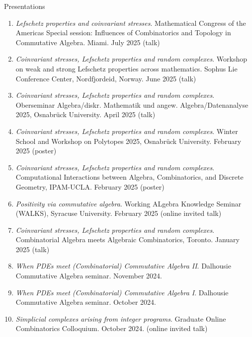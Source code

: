 \documentclass[12pt]{resume} %
\begin{document}

 
\begin{rSection}{Presentations}
    \begin{enumerate}
        \item \textit{Lefschetz properties and coinvariant stresses}. Mathematical Congress of the Americas Special session: Influences of Combinatorics and Topology in Commutative Algebra. Miami. July 2025 (talk)
        \item \textit{Coinvariant stresses, Lefschetz properties and random complexes}. Workshop on weak and strong Lefschetz properties across mathematics. Sophus Lie Conference Center, Nordfjordeid, Norway. June 2025 (talk)
        \item \textit{Coinvariant stresses, Lefschetz properties and random complexes}. Oberseminar Algebra/diskr. Mathematik und angew. Algebra/Datenanalyse 2025, Osnabrück University. April 2025 (talk)
        \item \textit{Coinvariant stresses, Lefschetz properties and random complexes}. Winter School and Workshop on Polytopes 2025, Osnabrück University. February 2025 (poster)
        \item \textit{Coinvariant stresses, Lefschetz properties and random complexes}. Computational Interactions between Algebra, Combinatorics, and Discrete Geometry, IPAM-UCLA. February 2025 (poster)
        \item \textit{Positivity via commutative algebra}. Working ALgebra Knowledge Seminar (WALKS), Syracuse University. February 2025 (online invited talk)
        \item \textit{Coinvariant stresses, Lefschetz properties and random complexes}. Combinatorial Algebra meets Algebraic Combinatorics, Toronto. January 2025 (talk)
        \item \textit{When PDEs meet (Combinatorial) Commutative Algebra II}. Dalhousie Commutative Algebra seminar. November 2024.
        \item \textit{When PDEs meet (Combinatorial) Commutative Algebra I}. Dalhousie Commutative Algebra seminar. October 2024.
        \item \textit{Simplicial complexes arising from integer programs}. Graduate Online Combinatorics Colloquium. October 2024. (online invited talk)

\end{enumerate}
\end{rSection}
\end{document}
